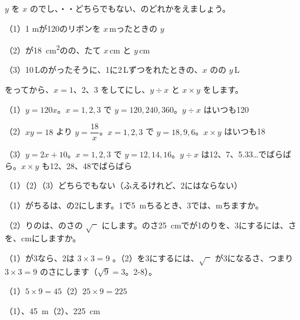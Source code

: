 \begin{reidai}
$y$ を $x$ のでし、・・どちらでもない、のどれかをえましょう。\par
（1）1 mが120のリボンを $x$\,mったときの $y$ \par
（2）が\qty{18}{cm^2}のの、たて $x$\,cm と $y$\,cm\par
（3）10\,Lのがったそうに、1に2\,Lずつをれたときの、$x$ のの $y$\,L\par
\kangaekata {}をってから、$x=1$、2、3 をしてにし、$y\div x$ と $x\times y$ をします。\par
\shiki（1）\nobreak $y=120x$。$x=1,2,3$ で $y=120,240,360$。$y\div x$ はいつも120\par
\hspace*{2.6\zw}（2）\nobreak $xy=18$ より $y=\dfrac{18}{x}$。$x=1,2,3$ で $y=18,9,6$。$x\times y$ はいつも18\par
\hspace*{2.6\zw}（3）\nobreak $y=2x+10$。$x=1,2,3$ で $y=12,14,16$。$y\div x$ は12、7、5.33…でばらばら。$x\times y$ も12、28、48でばらばら\par
\kotae（1）\nobreak {}\quad（2）\nobreak {}\quad（3）\nobreak どちらでもない（ふえるけれど、2にはならない）
\end{reidai}

\begin{reidai}
（1）がちるは、の2にします。1で\qty{5}{m}ちるとき、3では、mちますか。\par
（2）りのは、のさの $\sqrt{\phantom{x}}$ にします。のさ\qty{25}{cm}でが1のりを、3にするには、さを、cmにしますか。\par
\kangaekata （1）が3なら、2は $3\times3=9$ 。（2）を3にするには、$\sqrt{\phantom{x}}$ が3になるさ、つまり $3\times3=9$ のさにします（$\sqrt{9}=3$。2-8）。\par
\shiki（1）\nobreak $5\times9=45$\quad（2）\nobreak $25\times9=225$\par
\kotae（1）、\qty{45}{m}\quad（2）、\qty{225}{cm}
\end{reidai}

